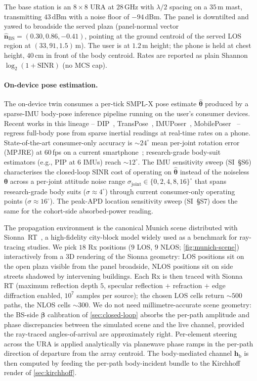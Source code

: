 \documentclass[journal,twocolumn,10pt]{IEEEtran}
\theoremstyle{plain}
\theoremstyle{definition}
\theoremstyle{remark}
\newcommand{\hbody}{\bm{h}_{\mathrm{b}}}
\begin{document}
The base station is an $8\times 8$ URA at $28\,$GHz with
$\lambda/2$ spacing on a $35\,$m mast, transmitting $43\,$dBm with
a noise floor of $-94\,$dBm. The panel is downtilted and yawed to
broadside the served plaza (panel-normal vector
$\hat{\bm{n}}_\mathrm{BS} = (0.30, 0.86, -0.41)$, pointing at the
ground centroid of the served LOS region at $(33, 91, 1.5)\,$m). The user is at
$1.2\,$m height; the phone is held at chest height, $40\,$cm in
front of the body centroid. Rates are reported as plain Shannon
$\log_2(1 + \mathrm{SINR})$ (no MCS cap).

\paragraph*{On-device pose estimation.} The on-device twin
consumes a per-tick SMPL-X pose estimate $\hat{\bm{\theta}}$
produced by a sparse-IMU body-pose inference pipeline running
on the user's consumer devices. Recent works in this lineage --
DIP~\cite{DIP2018}, TransPose~\cite{TransPose2021},
IMUPoser~\cite{Mollyn2023IMUPoser}, MobilePoser~\cite{Xu2024MobilePoser}
-- regress full-body pose from sparse inertial readings at
real-time rates on a phone. State-of-the-art consumer-only
accuracy is $\sim\!24^{\circ}$ mean per-joint rotation error
(MPJRE) at $60\,$fps on a current smartphone~\cite{Xu2024MobilePoser};
research-grade body-suit estimators (e.g., PIP at $6$ IMUs)
reach $\sim\!12^{\circ}$. The IMU sensitivity sweep
(SI~\S{}S6) characterises the closed-loop SINR cost of
operating on $\hat{\bm{\theta}}$ instead of the noiseless
$\bm{\theta}$ across a per-joint attitude noise range
$\sigma_\mathrm{joint} \in \{0, 2, 4, 8, 16\}^{\circ}$ that
spans research-grade body suits ($\sigma \approx 4^{\circ}$)
through current consumer-only operating points
($\sigma \approx 16^{\circ}$). The peak-APD location
sensitivity sweep (SI~\S{}S7) does the same for the cohort-side
absorbed-power reading.

The propagation environment is the canonical Munich scene
distributed with Sionna~RT~\cite{Hoydis2023Sionna}, a high-fidelity
city-block model widely used as a benchmark for ray-tracing studies.
We pick $18$ Rx positions ($9$ LOS, $9$ NLOS;
\cref{fig:munich-scene}) interactively from a 3D rendering of the
Sionna geometry: LOS positions sit on the open plaza visible from
the panel broadside, NLOS positions sit on side streets shadowed
by intervening buildings. Each Rx is then traced with Sionna RT
(maximum reflection depth $5$, specular reflection $+$ refraction
$+$ edge diffraction enabled, $10^{7}$ samples per source); the
chosen LOS cells return $\sim\!500$ paths, the NLOS cells $\sim\!300$. We do not need millimetre-accurate scene
geometry: the BS-side $\bm{\beta}$ calibration of
\cref{sec:closed-loop} absorbs the per-path amplitude and phase
discrepancies between the simulated scene and the live channel,
provided the ray-traced angles-of-arrival are approximately right.
Per-element steering across the URA is applied analytically via
planewave phase ramps in the per-path direction of departure from
the array centroid. The body-mediated channel $\hbody$ is then
computed by feeding the per-path body-incident bundle to the
Kirchhoff render of \cref{sec:kirchhoff}.
\end{document}
